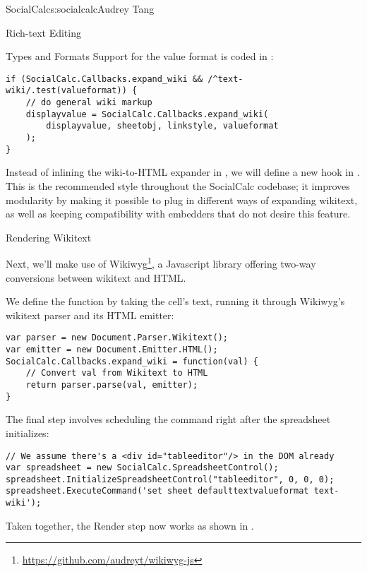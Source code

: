 \begin{aosachapter}{SocialCalc}{s:socialcalc}{Audrey Tang}
\begin{aosasect1}{Rich-text Editing}
\begin{aosasect2}{Types and Formats}
\noindent Support for the  value format is coded in
:

\begin{verbatim}
if (SocialCalc.Callbacks.expand_wiki && /^text-wiki/.test(valueformat)) {
    // do general wiki markup
    displayvalue = SocialCalc.Callbacks.expand_wiki(
        displayvalue, sheetobj, linkstyle, valueformat
    );
}
\end{verbatim}

Instead of inlining the wiki-to-HTML expander in
, we will define a new hook in
.  This is the recommended style
throughout the SocialCalc codebase; it improves modularity by making
it possible to plug in different ways of expanding wikitext, as well
as keeping compatibility with embedders that do not desire this
feature.

\end{aosasect2}

\begin{aosasect2}{Rendering Wikitext}

Next, we'll make use of
Wikiwyg\footnote{\url{https://github.com/audreyt/wikiwyg-js}}, a
Javascript library offering two-way conversions between wikitext and
HTML.

We define the  function by taking the cell's text,
running it through Wikiwyg's wikitext parser and its HTML emitter:

\begin{verbatim}
var parser = new Document.Parser.Wikitext();
var emitter = new Document.Emitter.HTML();
SocialCalc.Callbacks.expand_wiki = function(val) {
    // Convert val from Wikitext to HTML
    return parser.parse(val, emitter);
}
\end{verbatim}

\pagebreak 
\noindent The final step involves scheduling the  command right after the
spreadsheet initializes:


\begin{verbatim}
// We assume there's a <div id="tableeditor"/> in the DOM already
var spreadsheet = new SocialCalc.SpreadsheetControl();
spreadsheet.InitializeSpreadsheetControl("tableeditor", 0, 0, 0);
spreadsheet.ExecuteCommand('set sheet defaulttextvalueformat text-wiki');
\end{verbatim}

\noindent Taken together, the Render step now works as shown in
.


\end{aosasect2}
\end{aosasect1}
\end{aosachapter}
